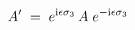 \begin{equation}
\label{gt1}
A' \;=\; e^{{\rm i} \epsilon \sigma_3} \, A \; e^{- {\rm i} \epsilon
\sigma_3}
\end{equation}

